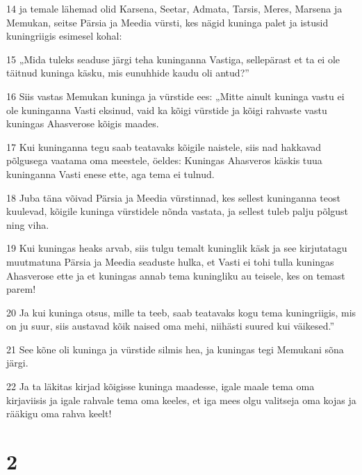 \par 14 ja temale lähemad olid Karsena, Seetar, Admata, Tarsis, Meres, Marsena ja Memukan, seitse Pärsia ja Meedia vürsti, kes nägid kuninga palet ja istusid kuningriigis esimesel kohal:
\par 15 „Mida tuleks seaduse järgi teha kuninganna Vastiga, sellepärast et ta ei ole täitnud kuninga käsku, mis eunuhhide kaudu oli antud?”
\par 16 Siis vastas Memukan kuninga ja vürstide ees: „Mitte ainult kuninga vastu ei ole kuninganna Vasti eksinud, vaid ka kõigi vürstide ja kõigi rahvaste vastu kuningas Ahasverose kõigis maades.
\par 17 Kui kuninganna tegu saab teatavaks kõigile naistele, siis nad hakkavad põlgusega vaatama oma meestele, öeldes: Kuningas Ahasveros käskis tuua kuninganna Vasti enese ette, aga tema ei tulnud.
\par 18 Juba täna võivad Pärsia ja Meedia vürstinnad, kes sellest kuninganna teost kuulevad, kõigile kuninga vürstidele nõnda vastata, ja sellest tuleb palju põlgust ning viha.
\par 19 Kui kuningas heaks arvab, siis tulgu temalt kuninglik käsk ja see kirjutatagu muutmatuna Pärsia ja Meedia seaduste hulka, et Vasti ei tohi tulla kuningas Ahasverose ette ja et kuningas annab tema kuningliku au teisele, kes on temast parem!
\par 20 Ja kui kuninga otsus, mille ta teeb, saab teatavaks kogu tema kuningriigis, mis on ju suur, siis austavad kõik naised oma mehi, niihästi suured kui väikesed.”
\par 21 See kõne oli kuninga ja vürstide silmis hea, ja kuningas tegi Memukani sõna järgi.
\par 22 Ja ta läkitas kirjad kõigisse kuninga maadesse, igale maale tema oma kirjaviisis ja igale rahvale tema oma keeles, et iga mees olgu valitseja oma kojas ja rääkigu oma rahva keelt!

\chapter{2}

